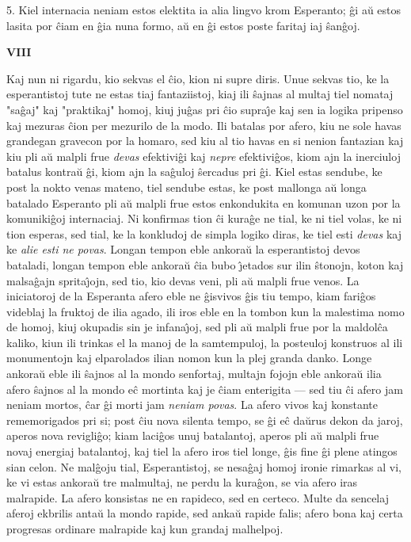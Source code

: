 5. Kiel internacia neniam estos elektita ia alia lingvo krom
Esperanto; \^gi a\u u estos lasita por \^ciam en \^gia nuna formo,
a\u u en \^gi estos poste faritaj iaj \^san\^goj.

\begin{center}
\textbf{VIII}
\end{center}

   Kaj nun ni rigardu, kio sekvas el \^cio, kion ni supre diris. Unue
sekvas tio, ke la esperantistoj tute ne estas tiaj fantaziistoj,
kiaj ili \^sajnas al multaj tiel nomataj "sa\^gaj" kaj
"praktikaj" homoj, kiuj ju\^gas pri \^cio supra\^{\j}e kaj sen ia
logika pripenso kaj mezuras \^cion per mezurilo de la modo. Ili
batalas por afero, kiu ne sole havas grandegan gravecon por la
homaro, sed kiu al tio havas en si nenion fantazian kaj kiu pli a\u
u malpli frue {\sl devas} efektivi\^gi kaj {\sl nepre}
efektivi\^gos, kiom ajn la inerciuloj batalus kontra\u u \^gi, kiom
ajn la sa\^guloj \^sercadus pri \^gi. Kiel estas sendube, ke post la
nokto venas mateno, tiel sendube estas, ke post mallonga a\u u longa
batalado Esperanto pli a\u u malpli frue estos enkondukita en
komunan uzon por la komuniki\^goj internaciaj. Ni konfirmas tion
\^ci kura\^ge ne tial, ke ni tiel volas, ke ni tion esperas, sed
tial, ke la konkludoj de simpla logiko diras, ke tiel esti {\sl
devas} kaj ke {\sl alie esti ne povas}. Longan tempon eble ankora\u
u la esperantistoj devos bataladi, longan tempon eble ankora\u u
\^cia bubo \^{\j}etados sur ilin \^stonojn, koton kaj malsa\^gajn
sprita\^{\j}ojn, sed tio, kio devas veni, pli a\u u malpli frue
venos. La iniciatoroj de la Esperanta afero eble ne \^gisvivos \^gis
tiu tempo, kiam fari\^gos videblaj la fruktoj de ilia agado, ili
iros eble en la tombon kun la malestima nomo de homoj, kiuj okupadis
sin je infana\^{\j}oj, sed pli a\u u malpli frue por la maldol\^ca
kaliko, kiun ili trinkas el la manoj de la samtempuloj, la posteuloj
konstruos al ili monumentojn kaj elparolados ilian nomon kun la plej
granda danko. Longe ankora\u u eble ili \^sajnos al la mondo
senfortaj, multajn fojojn eble ankora\u u ilia afero \^sajnos al la
mondo e\^c mortinta kaj je \^ciam enterigita --- sed tiu \^ci afero
jam neniam mortos, \^car \^gi morti jam {\sl neniam povas}. La afero
vivos kaj konstante rememorigados pri si; post \^ciu nova silenta
tempo, se \^gi e\^c da\u urus dekon da jaroj, aperos nova
revigli\^go; kiam laci\^gos unuj batalantoj, aperos pli a\u u malpli
frue novaj energiaj batalantoj, kaj tiel la afero iros tiel longe,
\^gis fine \^gi plene atingos sian celon. Ne mal\^goju tial,
Esperantistoj, se nesa\^gaj homoj ironie rimarkas al vi, ke vi estas
ankora\u u tre malmultaj, ne perdu la kura\^gon, se via afero iras
malrapide. La afero konsistas ne en rapideco, sed en certeco. Multe
da sencelaj aferoj ekbrilis anta\u u la mondo rapide, sed anka\u u
rapide falis; afero bona kaj certa progresas ordinare malrapide kaj
kun grandaj malhelpoj.

